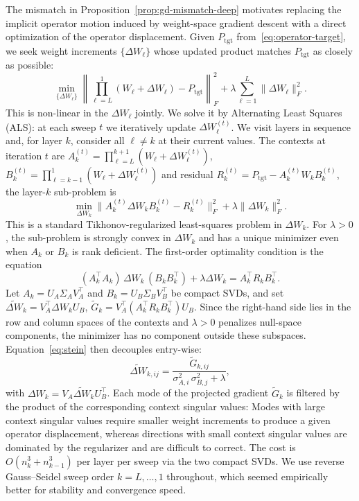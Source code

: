 \documentclass{article}
\newcommand{\normF}[1]{\|#1\|_F}
\newcommand{\Ptgt}{P_{\mathrm{tgt}}}
\begin{document}
The mismatch in Proposition~\ref{prop:gd-mismatch-deep} motivates replacing
the implicit operator motion induced by weight-space gradient descent with a
direct optimization of the operator displacement.
Given $\Ptgt$ from~\eqref{eq:operator-target}, we seek weight increments
$\{\Delta W_\ell\}$ whose updated product matches $\Ptgt$ as closely as
possible:
\begin{equation}
  \min_{\{\Delta W_\ell\}}
  \left\|
    \prod_{\ell=L}^{1}(W_\ell + \Delta W_\ell) - \Ptgt
  \right\|_F^2
  + \lambda \sum_{\ell=1}^{L} \normF{\Delta W_\ell}^2.
  \label{eq:eopp}
\end{equation}
This is non-linear in the $\Delta W_\ell$ jointly.
We solve it by Alternating Least Squares (ALS): at each sweep $t$ we iteratively update $\Delta W_\ell^{(t)}$. We visit layers in sequence and, for layer $k$, consider all $\ell \ne k$ at their current values. The contexts at iteration $t$ are $A_k^{(t)} = \prod_{\ell=L}^{k+1}(W_\ell + \Delta W_\ell^{(t)})$, $B_k^{(t)} = \prod_{\ell=k-1}^{1}(W_\ell + \Delta W_\ell^{(t)})$ and residual
$R_k^{(t)} = \Ptgt - A_k^{(t)} W_k B_k^{(t)}$, the layer-$k$ sub-problem is
\begin{equation}
  \min_{\Delta W_k}
  \normF{A_k^{(t)} \Delta W_k B_k^{(t)} - R_k^{(t)}}^2 + \lambda \normF{\Delta W_k}^2.
  \label{eq:als-sub}
\end{equation}
This is a standard Tikhonov-regularized least-squares problem in $\Delta W_k$.
For $\lambda>0$, the sub-problem is strongly convex in $\Delta W_k$ and has a
unique minimizer even when $A_k$ or $B_k$ is rank deficient.
The first-order optimality condition is the  equation
\begin{equation}
  (A_k^\top A_k)\, \Delta W_k\, (B_k B_k^\top) + \lambda \Delta W_k
  = A_k^\top R_k B_k^\top.
  \label{eq:stein}
\end{equation}
Let $A_k = U_A \Sigma_A V_A^\top$ and $B_k = U_B \Sigma_B V_B^\top$ be
compact SVDs, and set
$\widetilde{\Delta W}_k = V_A^\top \Delta W_k U_B$,
$\widetilde G_k = V_A^\top (A_k^\top R_k B_k^\top) U_B$. Since the right-hand side lies in the row and column spaces of the contexts and $\lambda>0$ penalizes null-space components, the minimizer has no component outside these subspaces.
Equation~\eqref{eq:stein} then decouples entry-wise:
\begin{equation}
  \widetilde{\Delta W}_{k,ij}
  = \frac{\widetilde G_{k,ij}}{\sigma_{A,i}^2\, \sigma_{B,j}^2 + \lambda},
  \label{eq:modewise}
\end{equation}
with $\Delta W_k = V_A \widetilde{\Delta W}_k U_B^\top$.
Each mode of the projected gradient $\widetilde G_k$ is filtered by the product
of the corresponding context singular values: 
Modes with large context singular values require smaller weight increments to produce a given operator displacement, whereas directions with small context singular values are dominated by the regularizer and are difficult to correct.
The cost is $O(n_k^3 + n_{k-1}^3)$ per layer per sweep via the two compact SVDs.
We use reverse Gauss--Seidel sweep order $k = L, \dots, 1$ throughout, which seemed
empirically better for stability and convergence speed.
\end{document}
